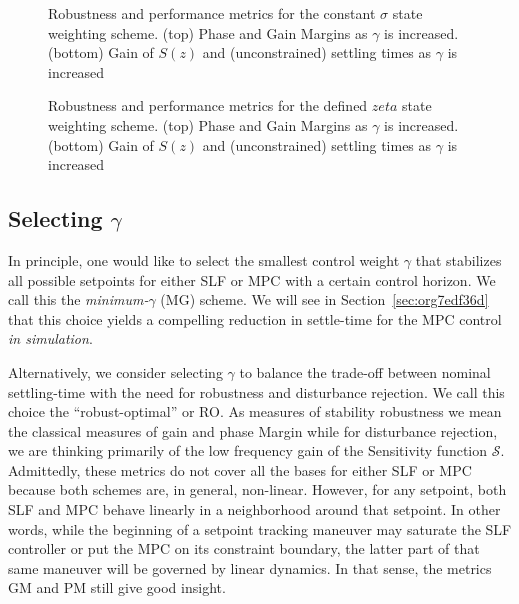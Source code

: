 \documentclass[journal,twocolumn,twoside]{IEEEtran}
\begin{document}
\begin{figure*}
  \begin{minipage}{0.48\textwidth}
    
    \caption{Robustness and performance metrics for the constant $\sigma$ state weighting scheme. (top) Phase and Gain Margins as $\gamma$ is increased. (bottom) Gain of $S(z)$ and (unconstrained) settling times as $\gamma$ is increased}
\label{fig:gmpm}
  \end{minipage}
  \hfil
  \begin{minipage}{0.48\textwidth}
    
    \caption{Robustness and performance metrics for the defined $zeta$ state weighting scheme. (top) Phase and Gain Margins as $\gamma$ is increased. (bottom) Gain of $S(z)$ and (unconstrained) settling times as $\gamma$ is increased}
    \label{fig:GainS}
  \end{minipage}
\end{figure*}


\subsection{Selecting $\gamma$}
In principle, one would like to select the smallest control weight $\gamma$ that stabilizes all possible setpoints for either SLF or MPC with a certain control horizon. We call this the \emph{minimum-$\gamma$} (MG) scheme. We will see in Section~\ref{sec:org7edf36d} that this choice yields a compelling reduction in settle-time for the MPC control \emph{in simulation}.

Alternatively, we consider selecting $\gamma$ to balance the trade-off between nominal settling-time with the need for robustness and disturbance rejection. We call this choice the ``robust-optimal'' or RO. As measures of stability robustness we mean the classical measures of gain and phase Margin while for disturbance rejection, we are thinking primarily of the low frequency gain of the Sensitivity function $\mathcal{S}$. Admittedly, these metrics do not cover all the bases for either SLF or MPC because both schemes are, in general, non-linear. However, for any setpoint, both SLF and MPC behave linearly in a neighborhood around that setpoint. In other words, while the beginning of a setpoint tracking maneuver may saturate the SLF controller or put the MPC on its constraint boundary, the latter part of that same maneuver will be governed by linear dynamics. In that sense, the metrics GM and PM still give good insight. %
\end{document}
